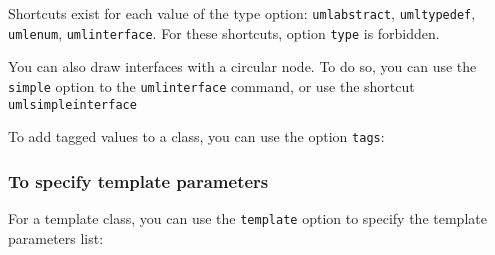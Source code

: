 \documentclass[a4paper,11pt]{report}
\begin{document}
\medskip

\begin{minipage}{0.5\textwidth}

\end{minipage}
\begin{minipage}{0.4\textwidth}
\begin{center}
\end{center}
\end{minipage}

\begin{remark}
Shortcuts exist for each value of the type option: {\tt umlabstract}, {\tt umltypedef}, {\tt umlenum}, {\tt umlinterface}. For these shortcuts, option {\tt type} is forbidden.
\end{remark}

\begin{remark}
You can also draw interfaces with a circular node. To do so, you can use the {\tt simple} option to the {\tt umlinterface} command, or use the shortcut {\tt umlsimpleinterface}
\end{remark}

\medskip

\begin{minipage}{0.5\textwidth}

\end{minipage}
\begin{minipage}{0.4\textwidth}
\begin{center}
\end{center}
\end{minipage}

To add tagged values to a class, you can use the option {\tt tags}:

\medskip

\begin{minipage}{0.5\textwidth}

\end{minipage}
\begin{minipage}{0.4\textwidth}
\begin{center}
\end{center}
\end{minipage}

\subsubsection{To specify template parameters}\label{ss.classtemplate}

For a template class, you can use the {\tt template} option to specify the template parameters list:
\end{document}
